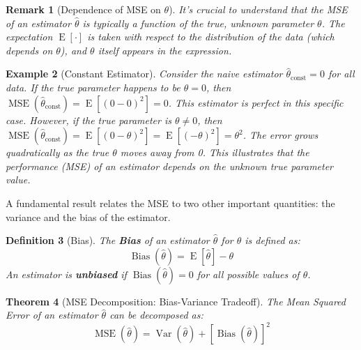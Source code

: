 \documentclass[11pt]{article}
\theoremstyle{mytheoremstyle}
\newtheorem{theorem}{Theorem}[section]
\theoremstyle{mydefinitionstyle}
\newtheorem{definition}[theorem]{Definition}
\newtheorem{example}[theorem]{Example}
\newtheorem{remark}[theorem]{Remark}
\DeclareMathOperator{\E}{E}
\DeclareMathOperator{\Var}{Var}
\DeclareMathOperator{\Bias}{Bias}
\DeclareMathOperator{\MSE}{MSE}
\begin{document}
\begin{remark}[Dependence of MSE on $\theta$]
It's crucial to understand that the MSE of an estimator $\hat{\theta}$ is typically a function of the true, unknown parameter $\theta$. The expectation $\E[\cdot]$ is taken with respect to the distribution of the data (which depends on $\theta$), and $\theta$ itself appears in the expression.
\end{remark}

\begin{example}[Constant Estimator]
Consider the naive estimator $\hat{\theta}_{\text{const}} = 0$ for all data.
If the true parameter happens to be $\theta = 0$, then $\MSE(\hat{\theta}_{\text{const}}) = \E[(0-0)^2] = 0$. This estimator is perfect in this specific case.
However, if the true parameter is $\theta \neq 0$, then $\MSE(\hat{\theta}_{\text{const}}) = \E[(0-\theta)^2] = \E[(-\theta)^2] = \theta^2$. The error grows quadratically as the true $\theta$ moves away from 0.
This illustrates that the performance (MSE) of an estimator depends on the unknown true parameter value.
\end{example}

A fundamental result relates the MSE to two other important quantities: the variance and the bias of the estimator.

\begin{definition}[Bias]
The \textbf{Bias} of an estimator $\hat{\theta}$ for $\theta$ is defined as:
\begin{equation*}
\Bias(\hat{\theta}) = \E[\hat{\theta}] - \theta
\end{equation*}
An estimator is \textbf{unbiased} if $\Bias(\hat{\theta}) = 0$ for all possible values of $\theta$.
\end{definition}

\begin{theorem}[MSE Decomposition: Bias-Variance Tradeoff]
The Mean Squared Error of an estimator $\hat{\theta}$ can be decomposed as:
\begin{equation*}
\MSE(\hat{\theta}) = \Var(\hat{\theta}) + [\Bias(\hat{\theta})]^2
\end{equation*}
\end{theorem}
\end{document}

